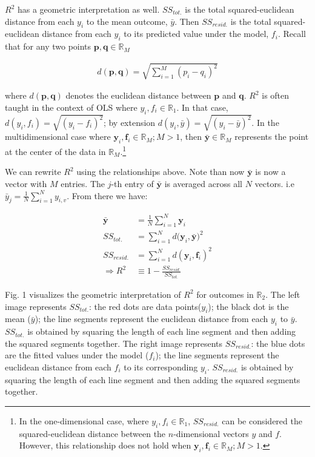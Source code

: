 \documentclass[conference,final,]{IEEEtran}
\begin{document}
\(R^2\) has a geometric interpretation as well. \(SS_{tot.}\) is the
total squared-euclidean distance from each \(y_i\) to the mean outcome,
\(\bar{y}\). Then \(SS_{resid.}\) is the total squared-euclidean
distance from each \(y_i\) to its predicted value under the model,
\(f_i\). Recall that for any two points
\(\mathbf{p}, \mathbf{q} \in \mathbb{R}_M\)

\begin{align}
    d(\mathbf{p},\mathbf{q}) = \sqrt{\sum_{i=1}^M{(p_i - q_i)^2}}
\end{align}

where \(d(\mathbf{p}, \mathbf{q})\) denotes the euclidean distance
between \(\mathbf{p}\) and \(\mathbf{q}\). \(R^2\) is often taught in
the context of OLS where \(y_i, f_i \in \mathbb{R}_1\). In that case,
\(d(y_i, f_i) = \sqrt{(y_i - f_i)^2}\); by extension
\(d(y_i, \bar{y}) = \sqrt{(y_i - \bar{y})^2}\). In the multidimensional
case where \(\mathbf{y}_i, \mathbf{f}_i \in \mathbb{R}_M; M > 1\), then
\(\bar{\mathbf{y}} \in \mathbb{R}_M\) represents the point at the center
of the data in \(\mathbb{R}_M\).\footnote{In the one-dimensional case,
  where \(y_i , f_i \in \mathbb{R}_1\), \(SS_{resid.}\) can be
  considered the squared-euclidean distance between the
  \(n\)-dimensional vectors \(y\) and \(f\). However, this relationship
  does not hold when
  \(\mathbf{y}_i , \mathbf{f}_i \in \mathbb{R}_M ; M > 1\).}

We can rewrite \(R^2\) using the relationships above. Note than now
\(\bar{\mathbf{y}}\) is now a vector with \(M\) entries. The \(j\)-th
entry of \(\bar{\mathbf{y}}\) is averaged across all \(N\) vectors. i.e
\(\bar{y}_j = \frac{1}{N} \sum_{i=1}^{N} y_{i,v}\). From there we have:

\begin{align}
    \bar{\mathbf{y}} &= \frac{1}{N} \sum_{i=1}^{N} \mathbf{y}_i \\ 
    SS_{tot.} &= \sum_{i=1}^N{d(\mathbf{y}_i, \bar{\mathbf{y}}})^2\\
    SS_{resid.} &= \sum_{i=1}^N{d(\mathbf{y}_i, \mathbf{f}_i)^2}\\
    \Rightarrow R^2 & \equiv 1 - \frac{SS_{resid.}}{SS_{tot.}}
\end{align}

Fig. 1 visualizes the geometric interpretation of \(R^2\) for outcomes
in \(\mathbb{R}_2\). The left image represents \(SS_{tot.}\): the red
dots are data points(\(y_i\)); the black dot is the mean (\(\bar{y}\));
the line segments represent the euclidean distance from each \(y_i\) to
\(\bar{y}\). \(SS_{tot.}\) is obtained by squaring the length of each
line segment and then adding the squared segments together. The right
image represents \(SS_{resid.}\): the blue dots are the fitted values
under the model (\(f_i\)); the line segments represent the euclidean
distance from each \(f_i\) to its corresponding \(y_i\). \(SS_{resid.}\)
is obtained by squaring the length of each line segment and then adding
the squared segments together.
\end{document}
